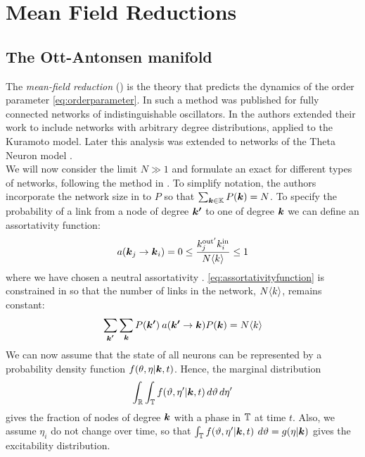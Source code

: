\newpage
\section{Mean Field Reductions}
\subsection{The Ott-Antonsen manifold}
The \textsl{mean-field reduction} (\MFR) is the theory that predicts the dynamics of the order parameter \eqref{eq:orderparameter}. In \cite{OttAntonsen2008, OttAntonsen2009, OttAntonsen2010} such a method was published for fully connected networks of indistinguishable oscillators. In \cite{Restrepo2014} the authors extended their work to include networks with arbitrary degree distributions, applied to the Kuramoto model. Later this analysis was extended to networks of the Theta Neuron model \cite{OttAntonsen2017}. \\

We will now consider the limit $N \gg 1$ and formulate an exact \MFR for different types of networks, following the method in \cite{OttAntonsen2017}. To simplify notation, the authors incorporate the network size in to $P$ so that $\sum_{{\boldsymbol{k}} \in {\mathbb{K}}} P({\boldsymbol{k}}) = N$. To specify the probability of a link from a node of degree ${\boldsymbol{k'}}$ to one of degree ${\boldsymbol{k}}$ we can define an assortativity function:
\begin{align}
a\left(\k_j \rightarrow \k_i \right) = 0 \leq \frac{k^{\rm{out}^{\prime}}_j k^{\rm{in}}_i}{N \kmean} \leq 1 \label{eq:assortativityfunction}
\end{align}
where we have chosen a neutral assortativity \cite{OttAntonsen2017}. \eqref{eq:assortativityfunction} is constrained in \cite{Restrepo2014} so that the number of links in the network, $N {\langle k\rangle}$, remains constant:
\begin{align*}
\sum_{\kacc} \sum_{\k} P\left( \kacc \right) \: a\left(\kacc \rightarrow \k\right) P\left(\k\right) = N\langle k\rangle
\end{align*}
We can now assume that the state of all neurons can be represented by a probability density function $f(\theta, \eta | {\boldsymbol{k}}, t)$. Hence, the marginal distribution 
\begin{align*}
    \int_{{\mathbb{R}}} \int_{{\mathbb{T}}} f(\vartheta, \eta^{\prime} | {\boldsymbol{k}}, t) \mathop{d \vartheta} \mathop{d \eta^{\prime}} 
\end{align*}
gives the fraction of nodes of degree ${\boldsymbol{k}}$ with a phase in ${\mathbb{T}}$ at time $t$. Also, we assume $\eta_i$ do not change over time, so that $\int_{{\mathbb{T}}} f(\vartheta, \eta^{\prime} | {\boldsymbol{k}}, t) \: \mathop{d \vartheta} = g(\eta | {\boldsymbol{k}})$ gives the excitability distribution. \\

